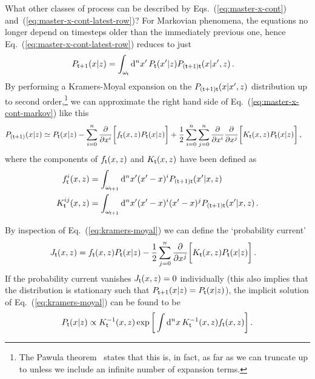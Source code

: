 What other classes of process can be described by Eqs.~(\ref{eq:master-x-cont}) and~(\ref{eq:master-x-cont-latest-row})? For Markovian phenomena, the equations no longer depend on timesteps older than the immediately previous one, hence Eq.~(\ref{eq:master-x-cont-latest-row}) reduces to just
\begin{align}
P_{{\sf t}+1}(x\vert z) &= \int_{\omega_{\sf t}}{\rm d}^nx' \, P_{\sf t}(x'\vert z) P_{({\sf t}+1){\sf t}}(x\vert x',z) \label{eq:master-x-cont-markov} \,.
\end{align}
By performing a Kramers-Moyal expansion on the $P_{({\sf t}+1){\sf t}}(x\vert x',z)$ distribution up to second order,\footnote{The Pawula theorem~\cite{pawula1967generalizations} states that this is, in fact, as far as we can truncate up to unless we include an infinite number of expansion terms.} we can approximate the right hand side of Eq.~(\ref{eq:master-x-cont-markov}) like this 
\begin{align}
P_{({\sf t}+1)}(x\vert z) &\simeq P_{{\sf t}}(x\vert z) - \sum_{i=0}^n\frac{\partial}{\partial x^i}\bigg[ f_{{\sf t}}(x,z)P_{{\sf t}}(x\vert z)\bigg] + \frac{1}{2}\sum_{i=0}^n\sum_{j=0}^n\frac{\partial}{\partial x^i}\frac{\partial}{\partial x^j}\bigg[ K_{{\sf t}}(x,z)P_{{\sf t}}(x\vert z)\bigg] \label{eq:kramers-moyal} \,,
\end{align}
where the components of $f_{{\sf t}}(x,z)$ and $K_{{\sf t}}(x,z)$ have been defined as
\begin{align}
f^i_{{\sf t}}(x,z) &= \int_{\omega_{{\sf t}+1}} {\rm d}^nx' (x'-x)^iP_{({\sf t}+1){\sf t}}(x'\vert x,z) \\
K^{ij}_{{\sf t}}(x,z) &= \int_{\omega_{{\sf t}+1}} {\rm d}^nx' (x'-x)^i(x'-x)^jP_{({\sf t}+1){\sf t}}(x'\vert x,z)\,.
\end{align}

By inspection of Eq.~(\ref{eq:kramers-moyal}) we can define the `probability current'
\begin{align}
J_{{\sf t}}(x,z) &= f_{{\sf t}}(x,z)P_{{\sf t}}(x\vert z) - \frac{1}{2}\sum_{j=0}^{n}\frac{\partial}{\partial x^j}\bigg[ K_{{\sf t}}(x,z)P_{{\sf t}}(x\vert z)\bigg] \,.
\end{align}
If the probability current vanishes $J_{{\sf t}}(x,z)=0$ individually (this also implies that the distribution is stationary such that $P_{{\sf t}+1}(x\vert z)=P_{{\sf t}}(x\vert z)$), the implicit solution of Eq.~(\ref{eq:kramers-moyal}) can be found to be
\begin{align}
P_{{\sf t}}(x\vert z) \propto K_{{\sf t}}^{-1}(x,z)\exp \bigg[ \int {\rm d}^nx\, K^{-1}_{{\sf t}}(x,z)f_{{\sf t}}(x,z)\bigg] \,.
\end{align}

